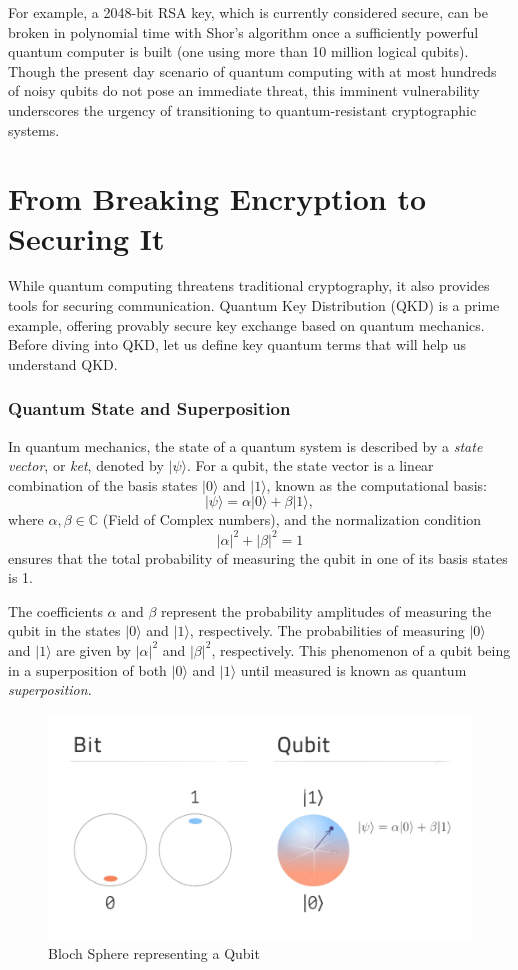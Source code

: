 \documentclass{article}
\begin{document}
For example, a 2048-bit RSA key, which is currently considered secure, can be broken in polynomial time with Shor’s algorithm once a sufficiently powerful quantum computer is built (one using more than 10 million logical qubits). Though the present day scenario of quantum computing with at most hundreds of noisy qubits do not pose an immediate threat,  this imminent vulnerability underscores the urgency of transitioning to quantum-resistant cryptographic systems.




\section*{From Breaking Encryption to Securing It}
While quantum computing threatens traditional cryptography, it also provides tools for securing communication. Quantum Key Distribution (QKD) is a prime example, offering provably secure key exchange based on quantum mechanics.
Before diving into QKD, let us define key quantum terms that will help us understand QKD.

\subsubsection*{Quantum State and Superposition}

In quantum mechanics, the state of a quantum system is described by a \textit{state vector}, or \textit{ket}, denoted by \( |\psi\rangle \). For a qubit, the state vector is a linear combination of the basis states \( |0\rangle \) and \( |1\rangle \), known as the computational basis:
\[
|\psi\rangle = \alpha |0\rangle + \beta |1\rangle,
\]
where \( \alpha, \beta \in \mathbb{C} \) (Field of Complex numbers), and the normalization condition
\[
|\alpha|^2 + |\beta|^2 = 1
\]
ensures that the total probability of measuring the qubit in one of its basis states is 1.

The coefficients \( \alpha \) and \( \beta \) represent the probability amplitudes of measuring the qubit in the states \( |0\rangle \) and \( |1\rangle \), respectively. The probabilities of measuring \( |0\rangle \) and \( |1\rangle \) are given by \( |\alpha|^2 \) and \( |\beta|^2 \), respectively.
This phenomenon of a qubit being in a superposition of both \( |0\rangle \) and \( |1\rangle \) until measured is known as quantum \textit{superposition}.
\begin{figure}[h]
    \centering
    \includegraphics[width = 9.00cm\textwidth]{qubit_processed.jpg}
     \caption{Bloch Sphere representing a Qubit}
   
\end{figure}
\end{document}
